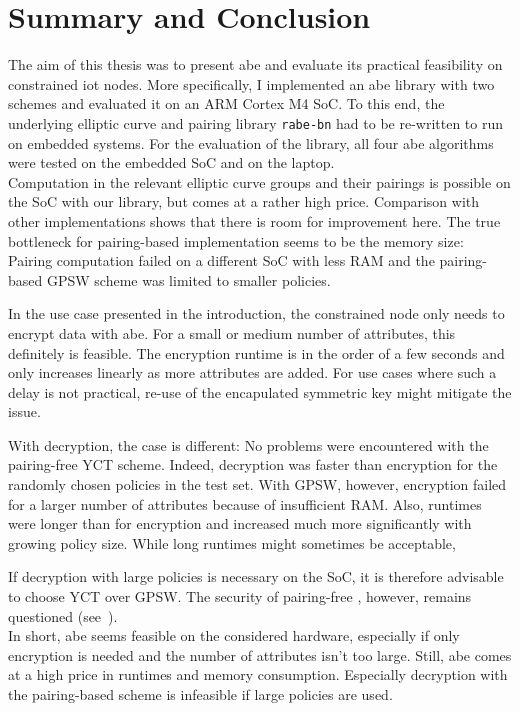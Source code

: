\chapter{Summary and Conclusion}

The aim of this thesis was to present \acrshort{abe} and evaluate its practical feasibility on constrained \acrshort{iot} nodes.
More specifically, I implemented an \acrfull{abe} library with two schemes and evaluated it on an ARM Cortex M4 SoC.
To this end, the underlying elliptic curve and pairing library \texttt{rabe-bn} had to be re-written to run on embedded systems.
For the evaluation of the library, all four \acrshort{abe} algorithms were tested on the embedded SoC and on the laptop.\\

Computation in the relevant elliptic curve groups and their pairings is possible on the SoC with our library, but comes at a rather high price.
Comparison with other implementations shows that there is room for improvement here.
The true bottleneck for pairing-based implementation seems to be the memory size:
Pairing computation failed on a different SoC with less RAM and the pairing-based GPSW scheme was limited to smaller policies.

In the use case presented in the introduction, the constrained node only needs to encrypt data with \acrshort{abe}.
For a small or medium number of attributes, this definitely is feasible.
The encryption runtime is in the order of a few seconds and only increases linearly as more attributes are added.
For use cases where such a delay is not practical, re-use of the encapulated symmetric key might mitigate the issue.

With decryption, the case is different: 
No problems were encountered with the pairing-free YCT scheme.
Indeed, decryption was faster than encryption for the randomly chosen policies in the test set.
With GPSW, however, encryption failed for a larger number of attributes because of insufficient RAM.
Also, runtimes were longer than for encryption and increased much more significantly with growing policy size.
While long runtimes might sometimes be acceptable, 

If decryption with large policies is necessary on the SoC, it is therefore advisable to choose YCT over GPSW.
The security of pairing-free , however, remains questioned (see~\cite{herranz_attacking_2020}).\\

In short, \acrfull{abe} seems feasible on the considered hardware, especially if only encryption is needed and the number of attributes isn't too large.
Still, \acrshort{abe} comes at a high price in runtimes and memory consumption.
Especially decryption with the pairing-based scheme is infeasible if large policies are used.